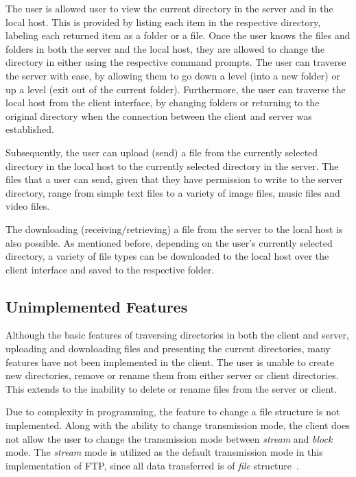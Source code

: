 \documentclass[10pt,twocolumn]{witseiepaper}
\begin{document}
The user is allowed user to view the current directory in the server and in the local host. This is provided by listing each item in the respective directory, labeling each returned item as a folder or a file. Once the user knows the files and folders in both the server and the local host, they are allowed to change the directory in either using the respective command prompts. The user can traverse the server with ease, by allowing them to go down a level (into a new folder) or up a level (exit out of the current folder). Furthermore, the user can traverse the local host from the client interface, by changing folders or returning to the original directory when the connection between the client and server was established.

Subsequently, the user can upload (send) a file from the currently selected directory in the local host to the currently selected directory in the server. The files that a user can send, given that they have permission to write to the server directory, range from simple text files to a variety of image files, music files and video files.

The downloading (receiving/retrieving) a file from the server to the local host is also possible. As mentioned before, depending on the user's currently selected directory, a variety of file types can be downloaded to the local host over the client interface and saved to the respective folder.

\subsection{Unimplemented Features}
\label{sec: Client Unimplemented Features}
Although the basic features of traversing directories in both the client and server, uploading and downloading files and presenting the current directories, many features have not been implemented in the client. The user is unable to create new directories, remove or rename them from either server or client directories. This extends to the inability to delete or rename files from the server or client.

Due to complexity in programming, the feature to change a file structure is not implemented. Along with the ability to change transmission mode, the client does not allow the user to change the transmission mode between \textit{stream} and \textit{block} mode. The \textit{stream} mode is utilized as the default transmission mode in this implementation of FTP, since all data transferred is of \textit{file} structure~\cite{RFC959}.
\end{document}
